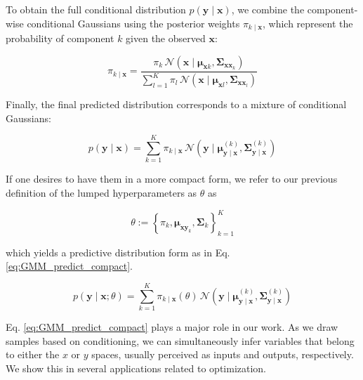 \documentclass{achemso}
\begin{document}
To obtain the full conditional distribution \(p(\boldsymbol{y} \mid \boldsymbol{x})\), we combine the component-wise conditional Gaussians using the posterior weights \(\pi_{k \mid \boldsymbol{x}}\), which represent the probability of component \(k\) given the observed \(\boldsymbol{x}\):

\begin{equation}
\pi_{k \mid \boldsymbol{x}} = \frac{\pi_k \, \mathcal{N}(\boldsymbol{x} \mid \boldsymbol{\mu}_{\boldsymbol{x}k}, \boldsymbol{\Sigma}_{\boldsymbol{xx}_k})}{\sum_{l=1}^K \pi_l \, \mathcal{N}(\boldsymbol{x} \mid \boldsymbol{\mu}_{\boldsymbol{x}l}, \boldsymbol{\Sigma}_{\boldsymbol{xx}_l})}
\end{equation}

Finally, the final predicted distribution corresponds to a mixture of conditional Gaussians:

\begin{equation}
p(\boldsymbol{y} \mid \boldsymbol{x}) = \sum_{k=1}^K \pi_{k \mid \boldsymbol{x}} \, \mathcal{N}(\boldsymbol{y} \mid \boldsymbol{\mu}_{\boldsymbol{y} \mid \boldsymbol{x}}^{(k)}, \boldsymbol{\Sigma}_{\boldsymbol{y} \mid \boldsymbol{x}}^{(k)})
\end{equation}

If one desires to have them in a more compact form, we refer to our previous definition of the lumped hyperparameters as \(\theta\) as

\begin{equation}
    \theta := \left\{ \pi_k, \boldsymbol{\mu}_{\boldsymbol{x} \boldsymbol{y}_k}, \boldsymbol{\Sigma}_{k} \right\}_{k=1}^K
\end{equation}


\noindent which yields a predictive distribution form as in Eq. \ref{eq:GMM_predict_compact}.

\begin{equation} \label{eq:GMM_predict_compact}
p(\boldsymbol{y} \mid \boldsymbol{x}; \theta) = \sum_{k=1}^K \pi_{k \mid \boldsymbol{x}}(\theta) \, \mathcal{N}(\boldsymbol{y} \mid \boldsymbol{\mu}_{\boldsymbol{y} \mid \boldsymbol{x}}^{(k)}, \boldsymbol{\Sigma}_{\boldsymbol{y} \mid \boldsymbol{x}}^{(k)})
\end{equation}


Eq. \ref{eq:GMM_predict_compact} plays a major role in our work. As we draw samples based on conditioning, we can simultaneously infer variables that belong to either the \(x\) or \(y\) spaces, usually perceived as inputs and outputs, respectively. We show this in several applications related to optimization.
\end{document}
